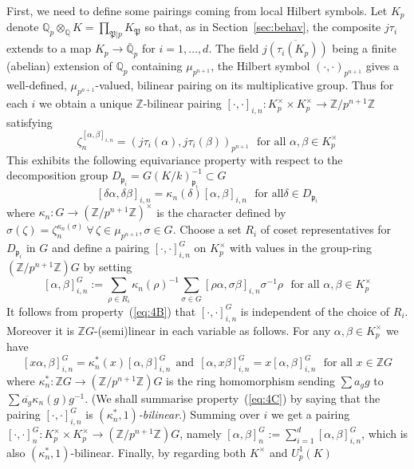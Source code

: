 \documentclass[12pt]{article}
\newcounter{rem}[section]%
\newcommand{\barbbQ}{\ensuremath{\bar{\bbQ}}}
\newcommand{\bbQ}{\ensuremath{\mathbb{Q}}}
\newcommand{\bbZ}{\ensuremath{\mathbb{Z}}}
\newcommand{\beql}[1]{\begin{equation}\label{#1}}
\newcommand{\eeq}{\end{equation}}
\newcommand{\fp}{\ensuremath{\mathfrak{p}}}
\newcommand{\fP}{\ensuremath{\mathfrak{P}}}
\newcommand{\inv}{^{-1}}%
\newcommand{\refeq}[1]{~(\ref{eq:#1})}
\newcommand{\rem}{\refstepcounter{rem}\noindent{\sc Remark \therem}}%
\renewcommand{\therem}{\thesection.\arabic{rem}}
\newcommand{\pnpo}{\ensuremath{{p^{n+1}}}}
\begin{document}
First, we need to define some pairings coming from local Hilbert symbols.
Let $K_p$ denote $\bbQ_p\otimes_\bbQ K=\prod_{\fP|p} K_\fP$ so that,
as in Section~\ref{sec:behav}, the composite
$j\tau_i$ extends to a map $K_p\rightarrow\barbbQ_p$ for
$i=1,\ldots,d$.
The field $\overline{j(\tau_i(K_p))}$ being
a finite (abelian) extension of $\bbQ_p$ containing $\mu_\pnpo$, the
Hilbert symbol
$(\cdot,\cdot)_\pnpo$ gives a well-defined, $\mu_\pnpo$-valued,
bilinear pairing on its multiplicative group.
Thus for each $i$ we obtain a unique $\bbZ$-bilinear pairing
$[\cdot,\cdot]_{i,n}: K_p^\times \times K_p^\times\rightarrow \bbZ/\pnpo\bbZ$ satisfying
\[
\zeta_n^{[\alpha,\beta]_{i,n}}=(j\tau_i(\alpha),j\tau_i(\beta))_\pnpo
\ \ \ \mbox{for all $\alpha,\beta\in K_p^\times$}
\]
This exhibits the following equivariance property with respect to
the decomposition group $D_{\fp_i}=G(K/k)^{-1}_{\fp_i}\subset G$
\beql{eq:4B}
[\delta\alpha,\delta\beta]_{i,n}=\kappa_n(\delta)[\alpha,\beta]_{i,n}\ \ \ \mbox{for all
$\delta\in D_{\fp_i}$}
\eeq
where $\kappa_n:G\rightarrow(\bbZ/\pnpo\bbZ)^\times$ is the character defined by
$\sigma(\zeta)=\zeta_n^{\kappa_n(\sigma)}\ \forall\,\zeta\in\mu_\pnpo,\sigma\in G$.
Choose a set $R_i$ of coset representatives for $D_{\fp_i}$ in $G$ and
define a pairing
$[\cdot,\cdot]^G_{i,n}$ on $K_p^\times$
with values in the group-ring $(\bbZ/\pnpo\bbZ)G$ by setting
\[
[\alpha,\beta]^G_{i,n}:=
\sum_{\rho\in R_i}
\kappa_n(\rho)\inv\sum_{\sigma\in G}[\rho\alpha,\sigma\beta]_{i,n}\sigma\inv\rho
\ \ \ \mbox{for all $\alpha,\beta\in K_p^\times$}
\]
It follows from property\refeq{4B} that $[\cdot,\cdot]^G_{i,n}$
is independent of the choice of $R_i$. Moreover it is
$\bbZ G$-(semi)linear in each variable as follows.
For any $\alpha,\beta\in K_p^\times$ we have
\beql{eq:4C}
[x\alpha,\beta]^G_{i,n}=
\kappa_n^\ast(x)[\alpha,\beta]^G_{i,n}
\ \ \mbox{and}\ \
[\alpha,x\beta]^G_{i,n}=
x[\alpha,\beta]^G_{i,n}\ \ \ \mbox{for all $x\in \bbZ G$}
\eeq
where $\kappa_n^\ast:\bbZ G\rightarrow (\bbZ/\pnpo \bbZ)G$ is the ring homomorphism
sending $\sum a_g g$ to $\sum \overline{a_g}\kappa_n(g)g\inv$.
(We shall summarise property\refeq{4C} by saying that the pairing
$[\cdot,\cdot]^G_{i,n}$ is \emph{$(\kappa_n^\ast,1)$-bilinear}.)
Summing over $i$ we get a
pairing $[\cdot,\cdot]^G_n:K_p^\times\times K_p^\times\rightarrow(\bbZ/\pnpo\bbZ)G$,
namely $[\alpha,\beta]^G_n:=\sum_{i=1}^d[\alpha,\beta]^G_{i,n}$, which
is also $(\kappa_n^\ast,1)$-bilinear.
Finally, by regarding both $K^\times$ and $U^1_p(K)$
\end{document}
